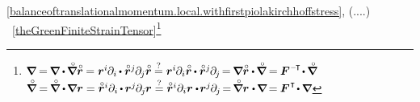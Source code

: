 \eqref{balanceoftranslationalmomentum.local.withfirstpiolakirchhoffstress}, (....)
~\eqref{theGreenFiniteStrainTensor}\footnote{%
${\boldnabla \hspace{-0.08ex}
= \hspace{-0.2ex} \boldnabla \dotp \hspace{-0.15ex} \boldnablacircled \initiallocationvector \hspace{-0.08ex}
= \currentlocationvector^{i} \hspace{-0.1ex} \partial_{i} \hspace{-0.15ex} \dotp \initiallocationvector^j \hspace{-0.1ex} \partial_{\hspace{-0.1ex}j} \initiallocationvector \hspace{-0.1ex}
\stackrel{?}{=} \currentlocationvector^{i} \hspace{-0.1ex} \partial_{i} \initiallocationvector \hspace{-0.1ex} \dotp \initiallocationvector^j \hspace{-0.1ex} \partial_{\hspace{-0.1ex}j} \hspace{-0.3ex}
= \hspace{-0.2ex} \boldnabla \initiallocationvector \dotp \hspace{-0.15ex} \boldnablacircled \hspace{-0.1ex}
= \hspace{-0.1ex} \bm{F}^{\hspace{.1ex}\expminusT} \hspace{-0.3ex} \dotp \hspace{-0.1ex} \boldnablacircled}$ \\
%
${\boldnablacircled \hspace{-0.1ex}
= \hspace{-0.2ex} \boldnablacircled \dotp \hspace{-0.2ex} \boldnabla \currentlocationvector
= \initiallocationvector^{i} \partial_{i} \hspace{-0.15ex} \dotp \hspace{-0.1ex} \currentlocationvector^{j} \hspace{-0.1ex} \partial_{\hspace{-0.1ex}j} \hspace{-0.1ex} \currentlocationvector
\stackrel{?}{=} \initiallocationvector^{i} \partial_{i} \currentlocationvector \dotp \hspace{-0.25ex} \currentlocationvector^{j} \hspace{-0.1ex} \partial_{\hspace{-0.1ex}j} \hspace{-0.3ex}
= \hspace{-0.3ex} \boldnablacircled \currentlocationvector \hspace{.1ex} \dotp \hspace{-0.15ex} \boldnabla \hspace{-0.25ex}
= \hspace{-0.1ex} \bm{F}^{\hspace{.1ex}\T} \hspace{-0.3ex} \dotp \hspace{-0.1ex} \boldnabla}$}

